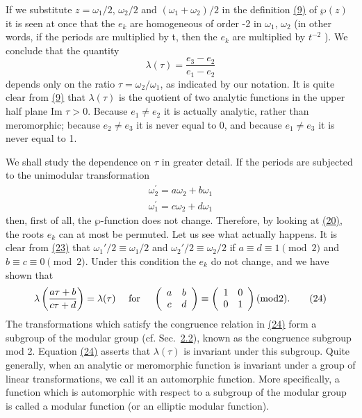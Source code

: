 If we substitute $z = \omega_{1}/2$, $\omega_{2}/2$ and $(\omega_{1} + \omega_{2})/2$ in the definition \hyperref[eq:7.9]{(9)} of $\wp(z)$ it is seen at once that the $e_{k}$ are homogeneous of order -2 in $\omega_{1}$, $\omega_{2}$ (in other words, if the periods are multiplied by t, then the $e_{k}$ are multiplied by $t^{-2}$ ). We conclude that the quantity
\begin{equation*}
\lambda (\tau) = \frac {e _ {3} - e _ {2}}{e _ {1} - e _ {2}}\tag{22}\label{eq:7.22}
\end{equation*}
depends only on the ratio $\tau = \omega_{2}/\omega_{1}$, as indicated by our notation. It is quite clear from \hyperref[eq:7.9]{(9)} that $\lambda(\tau)$ is the quotient of two analytic functions in the upper half plane Im $\tau > 0$. Because $e_{1} \neq e_{2}$ it is actually analytic, rather than meromorphic; because $e_{2} \neq e_{3}$ it is never equal to 0, and because $e_{1} \neq e_{3}$ it is never equal to 1.

We shall study the dependence on $\tau$ in greater detail. If the periods are subjected to the unimodular transformation
\begin{equation*}
\begin{array}{r} \omega_ {2} ^ {\prime} = a \omega_ {2} + b \omega_ {1} \\ \omega_ {1} ^ {\prime} = c \omega_ {2} + d \omega_ {1} \end{array}\tag{23}\label{eq:7.23}
\end{equation*}
then, first of all, the $\wp$-function does not change. Therefore, by looking at \hyperref[eq:7.20]{(20)}, the roots $e_k$ can at most be permuted. Let us see what actually happens. It is clear from \hyperref[eq:7.23]{(23)} that $\omega_1'/2 \equiv \omega_1/2$ and $\omega_2'/2 \equiv \omega_2/2$ if $a \equiv d \equiv 1 \pmod{2}$ and $b \equiv c \equiv 0 \pmod{2}$. Under this condition the $e_k$ do not change, and we have shown that
\begin{equation*}
\lambda \left(\frac {a \tau + b}{c \tau + d}\right) = \lambda (\tau) \quad \text {   for   } \quad \left( \begin{array}{c c} a & b \\ c & d \end{array} \right) \equiv \left( \begin{array}{c c} 1 & 0 \\ 0 & 1 \end{array} \right) (\mathrm{mod} 2).\tag{24}\label{eq:7.24}
\end{equation*}
The transformations which satisfy the congruence relation in \hyperref[eq:7.24]{(24)} form a subgroup of the modular group (cf. Sec.~\hyperref[sec:7.2.2]{2.2}), known as the congruence subgroup mod 2. Equation \hyperref[eq:7.24]{(24)} asserts that $\lambda(\tau)$ is invariant under this subgroup. Quite generally, when an analytic or meromorphic function is invariant under a group of linear transformations, we call it an automorphic function. More specifically, a function which is automorphic with respect to a subgroup of the modular group is called a modular function (or an elliptic modular function).

